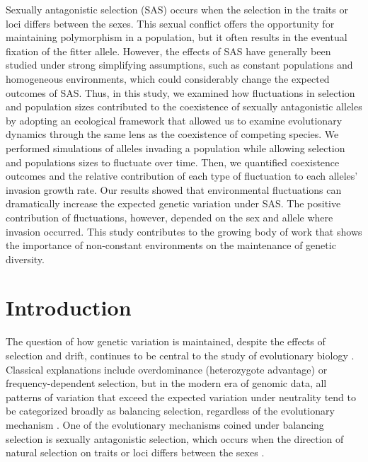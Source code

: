 \documentclass[12pt]{article}
\begin{document}
Sexually antagonistic selection (SAS) occurs when the selection in the traits or loci differs between the sexes. This sexual conflict offers the opportunity for maintaining polymorphism in a population, but it often results in the eventual fixation of the fitter allele. However, the effects of SAS have generally been studied under strong simplifying assumptions, such as constant populations and homogeneous environments, which could considerably change the expected outcomes of SAS. Thus, in this study, we examined how fluctuations in selection and population sizes contributed to the coexistence of sexually antagonistic alleles by adopting an ecological framework that allowed us to examine evolutionary dynamics through the same lens as the coexistence of competing species. We performed simulations of alleles invading a population while allowing selection and populations sizes to fluctuate over time.  Then, we quantified coexistence outcomes and the relative contribution of each type of fluctuation to each alleles' invasion growth rate. Our results showed that environmental fluctuations can dramatically increase the expected genetic variation under SAS. The positive contribution of fluctuations, however, depended on the sex and allele where invasion occurred. This study contributes to the growing body of work that shows the importance of non-constant environments on the maintenance of genetic diversity.


\clearpage
\section{Introduction}
The question of how genetic variation is maintained, despite the effects of selection and drift, continues to be central to the study of evolutionary biology \citep{walsh_evolution_2018}. Classical explanations include overdominance (heterozygote advantage) or frequency-dependent selection, but in the modern era of genomic data, all patterns of variation that exceed the expected variation under neutrality tend to be categorized broadly as balancing selection, regardless of the evolutionary mechanism \citep{mitchell-olds_which_2007}.  One of the evolutionary mechanisms coined under balancing selection is sexually antagonistic selection, which occurs when the direction of natural selection on traits or loci differs between the sexes \citep{lande1980sexual,arnqvist2013sexual}.
\end{document}
